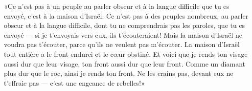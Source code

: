 «Ce n’est pas à un peuple au parler obscur et à la langue difficile que tu es envoyé,
	c’est à la maison d’Israël.
Ce n’est pas à des peuples nombreux, au parler obscur et à la langue difficile,
	dont tu ne comprendrais pas les paroles, que tu es envoyé
	--- si je t’envoyais vers eux, ils t’écouteraient!
Mais la maison d’Israël ne voudra pas t’écouter, parce qu’ils ne veulent pas m’écouter.
La maison d’Israël tout entière a le front endurci et le cœur obstiné.
Et voici que je rends ton visage aussi dur que leur visage,
	ton front aussi dur que leur front.
Comme un diamant plus dur que le roc, ainsi je rends ton front.
Ne les crains pas, devant eux ne t’effraie pas --- c’est une engeance de rebelles!»
